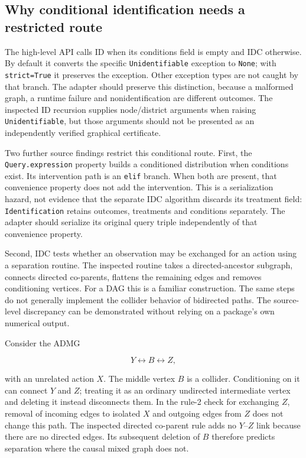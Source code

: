 \hypertarget{why-conditional-identification-needs-a-restricted-route}{%
\subsection{Why conditional identification needs a restricted
route}\label{why-conditional-identification-needs-a-restricted-route}}

The high-level API calls ID when its conditions field is empty and IDC
otherwise. By default it converts the specific \texttt{Unidentifiable}
exception to \texttt{None}; with \texttt{strict=True} it preserves the
exception. Other exception types are not caught by that branch. The
adapter should preserve this distinction, because a malformed graph, a
runtime failure and nonidentification are different outcomes. The
inspected ID recursion supplies node/district arguments when raising
\texttt{Unidentifiable}, but those arguments should not be presented as
an independently verified graphical certificate.
\citep{exec13_y0_api,exec13_y0_id}

Two further source findings restrict this conditional route. First, the
\texttt{Query.expression} property builds a conditioned distribution when
conditions exist. Its intervention path is an \texttt{elif} branch. When
both are present, that convenience property does not add the
intervention. This is a serialization hazard, not evidence that the
separate IDC algorithm discards its treatment field:
\texttt{Identification} retains outcomes, treatments and conditions
separately. The adapter should serialize its original query triple
independently of that convenience property. \citep{exec13_y0_utils}

Second, IDC tests whether an observation may be exchanged for an action
using a separation routine. The inspected routine takes a
directed-ancestor subgraph, connects directed co-parents, flattens the
remaining edges and removes conditioning vertices. For a DAG this is a
familiar construction. The same steps do not generally implement the
collider behavior of bidirected paths. The source-level discrepancy can
be demonstrated without relying on a package's own numerical output.
\citep{exec13_y0_idc,exec13_y0_rule2,exec13_y0_separation,exec13_y0_graph}

Consider the ADMG

\[
 Y\leftrightarrow B\leftrightarrow Z,
\]

with an unrelated action \(X\). The middle vertex \(B\) is a collider.
Conditioning on it can connect \(Y\) and \(Z\); treating it as an
ordinary undirected intermediate vertex and deleting it instead
disconnects them. In the rule-2 check for exchanging \(Z\), removal of
incoming edges to isolated \(X\) and outgoing edges from \(Z\) does not
change this path. The inspected directed co-parent rule adds no
\(Y\)--\(Z\) link because there are no directed edges. Its subsequent
deletion of \(B\) therefore predicts separation where the causal mixed
graph does not.

